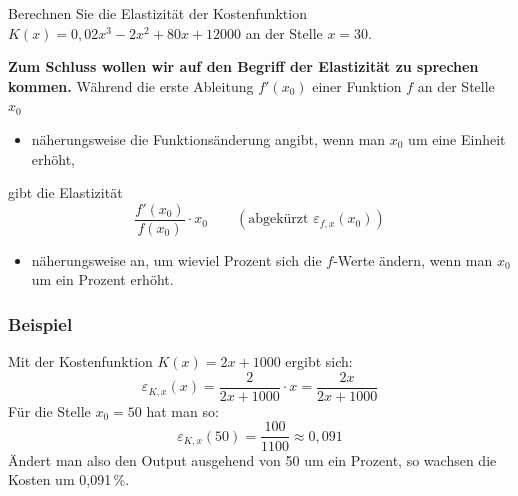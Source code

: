 \begin{graukasten}
  Berechnen Sie die Elastizität der Kostenfunktion $K(x) = 0{,}02 x^3 - 2x^2 + 80x + 12000$ an der Stelle $x = 30$.
\end{graukasten}

\textbf{Zum Schluss wollen wir auf den Begriff der \textbf{Elastizität} zu sprechen kommen.} Während die erste Ableitung $f'(x_0)$ einer Funktion $f$ an der Stelle $x_0$
\begin{itemize}
  \item näherungsweise die Funktionsänderung angibt, wenn man $x_0$ um eine Einheit erhöht,
\end{itemize}
gibt die Elastizität
\[ \frac{f'(x_0)}{f(x_0)} \cdot x_0 \qquad (\text{abgekürzt } \varepsilon_{f,x}(x_0)) \]
\begin{itemize}
  \item näherungsweise an, um wieviel Prozent sich die $f$-Werte ändern, wenn man $x_0$ um ein Prozent erhöht.
\end{itemize}

\subsubsection{Beispiel}

Mit der Kostenfunktion $K(x) = 2x + 1000$ ergibt sich:
\[ \varepsilon_{K,x}(x) = \frac{2}{2x + 1000} \cdot x = \frac{2x}{2x + 1000} \]
Für die Stelle $x_0 = 50$ hat man so:
\[ \varepsilon_{K,x}(50) = \frac{100}{1100} \approx 0{,}091 \]
Ändert man also den Output ausgehend von 50 um ein Prozent, so wachsen die Kosten um 0{,}091\,\%.\beispielende
